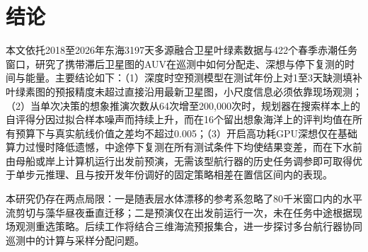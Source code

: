 \section{结论}

本文依托2018至2026年东海3197天多源融合卫星叶绿素数据与422个春季赤潮任务窗口，研究了携带滞后卫星图的AUV在巡测中如何分配走、深想与停下复测的时间与能量。主要结论如下：（1）深度时空预测模型在测试年份上对1至3天缺测填补叶绿素图的预报精度未超过直接沿用最新卫星图，小尺度信息必须依靠现场观测；（2）当单次决策的想象推演次数从64次增至200,000次时，规划器在搜索样本上的自评得分因过拟合样本噪声而持续上升，而在16个留出想象海洋上的评判均值在所有预算下与真实航线价值之差均不超过0.005；（3）开启高功耗GPU深想仅在基础算力过慢时降低遗憾，中途停下复测在所有测试条件下均使结果变差，而在下水前由母船或岸上计算机运行出发前预演，无需该型航行器的历史任务调参即可取得优于单步元推理、且与按开发年份调好的固定策略相差在置信区间内的表现。

本研究仍存在两点局限：一是随表层水体漂移的参考系忽略了80千米窗口内的水平流剪切与藻华昼夜垂直迁移；二是预演仅在出发前运行一次，未在任务中途根据现场观测重选策略。后续工作将结合三维海流预报集合，进一步探讨多台航行器协同巡测中的计算与采样分配问题。
